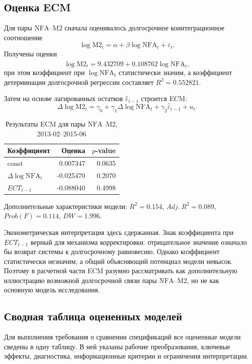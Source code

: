 \documentclass[12pt,a4paper]{article}
\begin{document}
\subsection{Оценка ECM}
Для пары $\mathrm{NFA}$--$\mathrm{M2}$ сначала оценивалось долгосрочное коинтеграционное
соотношение
\[
\log \mathrm{M2}_t = \alpha + \beta \log \mathrm{NFA}_t + \varepsilon_t.
\]
Получены оценки
\[
\widehat{\log \mathrm{M2}_t} = 9.432709 + 0.108762 \log \mathrm{NFA}_t,
\]
при этом коэффициент при $\log \mathrm{NFA}_t$ статистически значим, а коэффициент детерминации
долгосрочной регрессии составляет $R^2 = 0.552821$.

Затем на основе лагированных остатков $\widehat{\varepsilon}_{t-1}$ строится ECM:
\[
\Delta \log \mathrm{M2}_t = \gamma_0 + \gamma_1 \Delta \log \mathrm{NFA}_t + \gamma_2 \widehat{\varepsilon}_{t-1} + u_t.
\]

\begin{table}[H]
\centering
\caption{Результаты ECM для пары $\mathrm{NFA}$--$\mathrm{M2}$, 2013-02--2015-06}
\begin{tabular}{lrr}
\toprule
Коэффициент & Оценка & $p$-value \\
\midrule
const & 0.007347 & 0.0635 \\
$\Delta \log \mathrm{NFA}_t$ & -0.025470 & 0.2070 \\
$ECT_{t-1}$ & -0.088040 & 0.4998 \\
\bottomrule
\end{tabular}
\end{table}

Дополнительные характеристики модели: $R^2 = 0.154$, $Adj.\ R^2 = 0.089$,
$Prob(F) = 0.114$, $DW = 1.996$.

Эконометрическая интерпретация здесь сдержанная. Знак коэффициента при $ECT_{t-1}$ верный
для механизма корректировки: отрицательное значение означало бы возврат системы к
долгосрочному равновесию. Однако коэффициент статистически незначим, а общий объясняющий
потенциал модели невысок. Поэтому в расчетной части ECM разумно рассматривать как
дополнительную иллюстрацию возможной долгосрочной связи пары $\mathrm{NFA}$--$\mathrm{M2}$, но не как
основную модель исследования.

\subsection{Сводная таблица оцененных моделей}
Для выполнения требования о сравнении спецификаций все оцененные модели сведены в одну
таблицу. В ней указаны рабочие преобразования, ключевые эффекты, диагностика, информационные
критерии и ограничения интерпретации.
\end{document}

